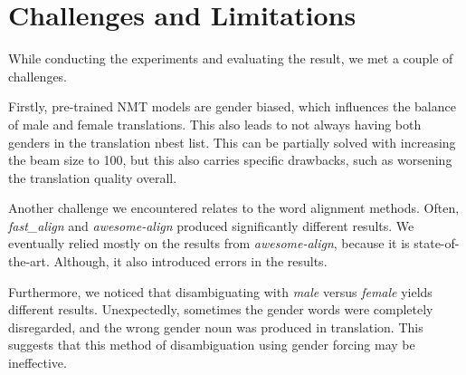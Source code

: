 \section{Challenges and Limitations}
\label{sec:Discussion:Challenges}

While conducting the experiments and evaluating the result, we met a couple of challenges.

Firstly, pre-trained NMT models are gender biased, which influences the balance of male and female translations. This also leads to not always having both genders in the translation nbest list. This can be partially solved with increasing the beam size to 100, but this also carries specific drawbacks, such as worsening the translation quality overall.

Another challenge we encountered relates to the word alignment methods. Often, \textit{fast\_align} and \textit{awesome-align} produced significantly different results. We eventually relied mostly on the results from \textit{awesome-align}, because it is state-of-the-art. Although, it also introduced errors in the results.

Furthermore, we noticed that disambiguating with \textit{male} versus \textit{female} yields different results. Unexpectedly, sometimes the gender words were completely disregarded, and the wrong gender noun was produced in translation. This suggests that this method of disambiguation using gender forcing may be ineffective.

